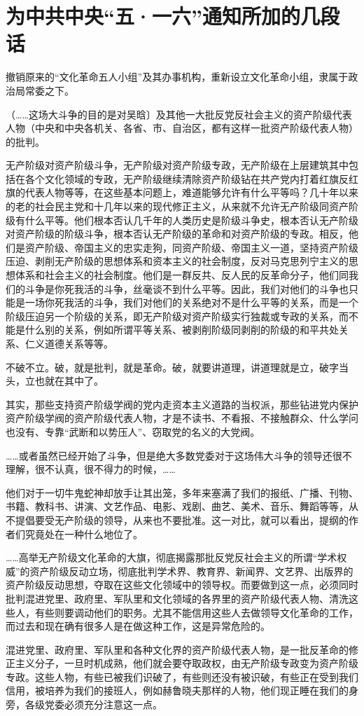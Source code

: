 \section[为中共中央“五·一六”通知所加的几段话（一九六六年五月十六日）]{为中共中央“五·一六”通知所加的几段话}


撤销原来的“文化革命五人小组”及其办事机构，重新设立文化革命小组，隶属于政治局常委之下。

（……这场大斗争的目的是对吴晗〕及其他一大批反党反社会主义的资产阶级代表人物（中央和中央各机关、各省、市、自治区，都有这样一批资产阶级代表人物）的批判。

无产阶级对资产阶级斗争，无产阶级对资产阶级专政，无产阶级在上层建筑其中包括在各个文化领域的专政，无产阶级继续清除资产阶级钻在共产党内打着红旗反红旗的代表人物等等，在这些基本问题上，难道能够允许有什么平等吗？几十年以来的老的社会民主党和十几年以来的现代修正主义，从来就不允许无产阶级同资产阶级有什么平等。他们根本否认几千年的人类历史是阶级斗争史，根本否认无产阶级对资产阶级的阶级斗争，根本否认无产阶级的革命和对资产阶级的专政。相反，他们是资产阶级、帝国主义的忠实走狗，同资产阶级、帝国主义一道，坚持资产阶级压迫、剥削无产阶级的思想体系和资本主义的社会制度，反对马克思列宁主义的思想体系和社会主义的社会制度。他们是一群反共、反人民的反革命分子，他们同我们的斗争是你死我活的斗争，丝毫谈不到什么平等。因此，我们对他们的斗争也只能是一场你死我活的斗争，我们对他们的关系绝对不是什么平等的关系，而是一个阶级压迫另一个阶级的关系，即无产阶级对资产阶级实行独裁或专政的关系，而不能是什么别的关系，例如所谓平等关系、被剥削阶级同剥削的阶级的和平共处关系、仁义道德关系等等。

不破不立。破，就是批判，就是革命。破，就要讲道理，讲道理就是立，破字当头，立也就在其中了。

其实，那些支持资产阶级学阀的党内走资本主义道路的当权派，那些钻进党内保护资产阶级学阀的资产阶级代表人物，才是不读书、不看报、不接触群众、什么学问也没有、专靠“武断和以势压人”、窃取党的名义的大党阀。

……或者虽然已经开始了斗争，但是绝大多数党委对于这场伟大斗争的领导还很不理解，很不认真，很不得力的时候，……

他们对于一切牛鬼蛇神却放手让其出笼，多年来塞满了我们的报纸、广播、刊物、书籍、教科书、讲演、文艺作品、电影、戏剧、曲艺、美术、音乐、舞蹈等等，从不提倡要受无产阶级的领导，从来也不要批准。这一对比，就可以看出，提纲的作者们究竟处在一种什么地位了。

……高举无产阶级文化革命的大旗，彻底揭露那批反党反社会主义的所谓“学术权威”的资产阶级反动立场，彻底批判学术界、教育界、新闻界、文艺界、出版界的资产阶级反动思想，夺取在这些文化领域中的领导权。而要做到这一点，必须同时批判混进党里、政府里、军队里和文化领域的各界里的资产阶级代表人物、清洗这些人，有些则要调动他们的职务。尤其不能信用这些人去做领导文化革命的工作，而过去和现在确有很多人是在做这种工作，这是异常危险的。

混进党里、政府里、军队里和各种文化界的资产阶级代表人物，是一批反革命的修正主义分子，一旦时机成熟，他们就会要夺取政权，由无产阶级专政变为资产阶级专政。这些人物，有些已被我们识破了，有些则还没有被识破，有些正在受到我们信用，被培养为我们的接班人，例如赫鲁晓夫那样的人物，他们现正睡在我们的身旁，各级党委必须充分注意这一点。

